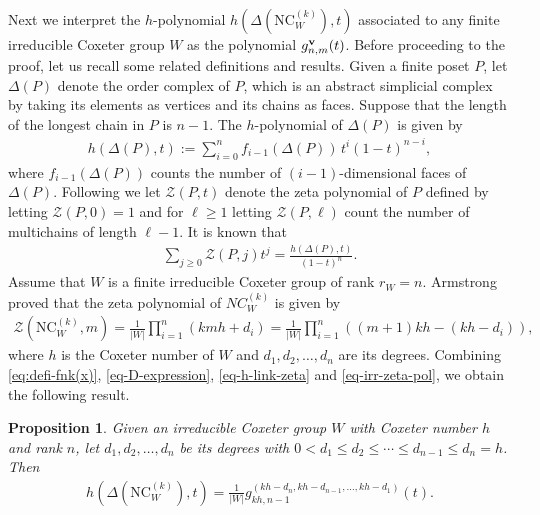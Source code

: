 \documentclass[12pt]{article}
\newtheorem{prop}[thm]{Proposition}
\newcommand{\NC}{\mathrm{NC}}
\numberwithin{equation}{section}
\begin{document}
Next we interpret the $h$-polynomial $h(\Delta(\NC^{(k)}_W),t)$ associated to any finite irreducible Coxeter group $W$ 
as the polynomial $g^{\bf{v}}_{n,m}(t)$.  
Before proceeding to the proof, let us recall some related definitions and results. 
Given a finite poset $P$, let $\Delta(P)$ denote the order complex of $P$, which is an abstract simplicial complex by taking its elements as vertices and its chains as faces.
Suppose that the length of the longest chain in $P$ is $n-1$.
The $h$-polynomial of $\Delta(P)$ is given by
\begin{align*}
h(\Delta(P),t) := \sum_{i=0}^{n} f_{i-1}(\Delta(P))\, t^i (1-t)^{n-i},
\end{align*}
where $f_{i-1}(\Delta(P))$ counts the number of $(i-1)$-dimensional faces of $\Delta(P)$. Following \cite{Athanasiadis-Douvropoulos-Kalampogia-Evangelinou-2024} we let $\mathcal{Z}(P,t)$ denote the zeta polynomial of $P$ defined by letting  $\mathcal{Z}(P,0)=1$ and for $\ell\geq 1$ letting $\mathcal{Z}(P,\ell)$ count the number of multichains of length $\ell-1$. 
It is known that
\begin{align}\label{eq-h-link-zeta}
    \sum_{j\ge 0}\mathcal{Z}(P,j)t^j=\frac{h(\Delta(P),t)}{(1-t)^n}.
\end{align}
Assume that $W$ is a finite irreducible Coxeter group of rank $r_W=n$. 
Armstrong \cite[Theorem 3.6.9]{Armstrong-2009} proved that the zeta polynomial of $NC^{(k)}_W$ is given by %
\begin{align}\label{eq-irr-zeta-pol}
\mathcal{Z}(\NC^{(k)}_W,m)=\frac{1}{|W|}\prod_{i=1}^n (kmh+d_i)=\frac{1}{|W|}\prod_{i=1}^n ((m+1)kh-(kh-d_i)),
\end{align}
where $h$ is the Coxeter number of $W$ and $d_1,d_2,\ldots,d_n$ are its degrees. 
Combining \eqref{eq:defi-fnk(x)}, \eqref{eq-D-expression}, \eqref{eq-h-link-zeta} and \eqref{eq-irr-zeta-pol}, we  obtain the following result. 

\begin{prop}\label{prop-hpol-operator}
Given an irreducible Coxeter group $W$ with Coxeter number $h$ and rank $n$, let $d_1,d_2,\ldots,d_n$ be its degrees with $0<d_1\le d_2\le \cdots \le d_{n-1}\le d_n=h$.
Then   
\begin{align*}%
h\left(\Delta\left(\NC^{(k)}_W\right),t\right)=\frac{1}{|W|}g^{(kh-d_n,kh-d_{n-1},\ldots,kh-d_1)}_{kh,n-1}(t).
\end{align*}
\end{prop}
\end{document}
